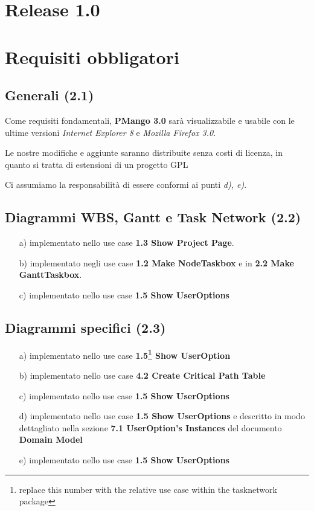\chapter*{Release \textbf{1.0}}

\chapter{Requisiti obbligatori}

\section{Generali (2.1)}
Come requisiti fondamentali, \textbf{PMango 3.0} sar\`a visualizzabile e
usabile con le ultime versioni \emph{Internet Explorer 8} e \emph{Mozilla
Firefox 3.0}.

Le nostre modifiche e aggiunte saranno distribuite senza costi di licenza, in
quanto si tratta di estensioni di un progetto GPL

Ci assumiamo la responsabilit\`a di essere conformi ai punti \emph{d), e)}.

\section{Diagrammi WBS, Gantt e Task Network (2.2)}
\begin{itemize}
  \item[a)] implementato nello use case \textbf{1.3 Show Project Page}.
  \item[b)] implementato negli use case \textbf{1.2 Make NodeTaskbox} e in
  \textbf{2.2 Make GanttTaskbox}.
  \item[c)] implementato nello use case \textbf{1.5 Show UserOptions}
\end{itemize}

\section{Diagrammi specifici (2.3)}
\begin{itemize}
  \item[a)] implementato nello use case \textbf{1.5\footnote{replace this
  number with the relative use case within the tasknetwork package} Show
  UserOption}
  \item[b)] implementato nello use case \textbf{4.2 Create Critical Path Table}
  \item[c)] implementato nello use case \textbf{1.5 Show UserOptions}
  \item[d)] implementato nello use case \textbf{1.5 Show UserOptions} e
  descritto in modo dettagliato nella sezione \textbf{7.1 UserOption’s
  Instances} del documento \textbf{Domain Model}
  \item[e)] implementato nello use case \textbf{1.5 Show UserOptions}
\end{itemize}

